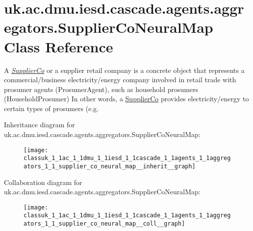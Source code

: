 \hypertarget{classuk_1_1ac_1_1dmu_1_1iesd_1_1cascade_1_1agents_1_1aggregators_1_1_supplier_co_neural_map}{\section{uk.\-ac.\-dmu.\-iesd.\-cascade.\-agents.\-aggregators.\-Supplier\-Co\-Neural\-Map Class Reference}
\label{classuk_1_1ac_1_1dmu_1_1iesd_1_1cascade_1_1agents_1_1aggregators_1_1_supplier_co_neural_map}
}


A {\itshape \hyperlink{classuk_1_1ac_1_1dmu_1_1iesd_1_1cascade_1_1agents_1_1aggregators_1_1_supplier_co}{Supplier\-Co}} or a supplier retail company is a concrete object that represents a commercial/business electricity/energy company involved in retail trade with prosumer agents ({\ttfamily Prosumer\-Agent}), such as household prosumers ({\ttfamily Household\-Prosumer}) In other words, a {\ttfamily \hyperlink{classuk_1_1ac_1_1dmu_1_1iesd_1_1cascade_1_1agents_1_1aggregators_1_1_supplier_co}{Supplier\-Co}} provides electricity/energy to certain types of prosumers (e.\-g.  




Inheritance diagram for uk.\-ac.\-dmu.\-iesd.\-cascade.\-agents.\-aggregators.\-Supplier\-Co\-Neural\-Map\-:\nopagebreak
\begin{figure}[H]
\begin{center}
\leavevmode
\texttt{[image: classuk\_1\_1ac\_1\_1dmu\_1\_1iesd\_1\_1cascade\_1\_1agents\_1\_1aggregators\_1\_1\_supplier\_co\_neural\_map\_\_inherit\_\_graph]}
\end{center}
\end{figure}


Collaboration diagram for uk.\-ac.\-dmu.\-iesd.\-cascade.\-agents.\-aggregators.\-Supplier\-Co\-Neural\-Map\-:\nopagebreak
\begin{figure}[H]
\begin{center}
\leavevmode
\texttt{[image: classuk\_1\_1ac\_1\_1dmu\_1\_1iesd\_1\_1cascade\_1\_1agents\_1\_1aggregators\_1\_1\_supplier\_co\_neural\_map\_\_coll\_\_graph]}
\end{center}
\end{figure}
